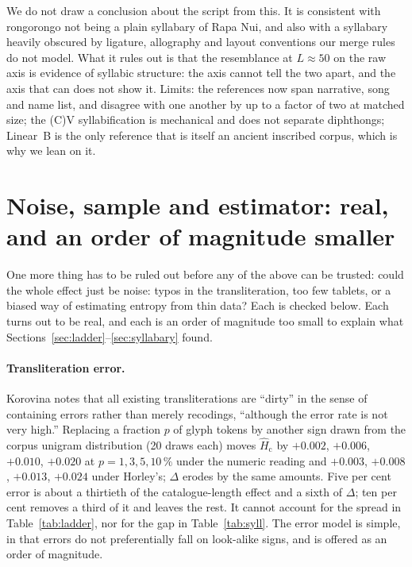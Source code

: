 \documentclass[11pt,a4paper]{article}
\newcommand{\Hcn}{\hat H_{\mathrm{c}}}
\begin{document}
We do not draw a conclusion about the script from this. It is consistent with rongorongo not being a plain syllabary of Rapa Nui, and also with a syllabary heavily obscured by ligature, allography and layout conventions our merge rules do not model. What it rules out is that the resemblance at $L\approx50$ on the raw axis is evidence of syllabic structure: the axis cannot tell the two apart, and the axis that can does not show it. Limits: the references now span narrative, song and name list, and disagree with one another by up to a factor of two at matched size; the (C)V syllabification is mechanical and does not separate diphthongs; Linear~B is the only reference that is itself an ancient inscribed corpus, which is why we lean on it.

\section{Noise, sample and estimator: real, and an order of magnitude smaller}
\label{sec:noise}

One more thing has to be ruled out before any of the above can be trusted: could the whole effect just be noise: typos in the transliteration, too few tablets, or a biased way of estimating entropy from thin data? Each is checked below. Each turns out to be real, and each is an order of magnitude too small to explain what Sections~\ref{sec:ladder}--\ref{sec:syllabary} found.

\paragraph{Transliteration error.} Korovina notes that all existing transliterations are ``dirty'' in the sense of containing errors rather than merely recodings, ``although the error rate is not very high.'' Replacing a fraction $p$ of glyph tokens by another sign drawn from the corpus unigram distribution (20 draws each) moves $\Hcn$ by $+0.002$, $+0.006$, $+0.010$, $+0.020$ at $p=1,3,5,10\,\%$ under the numeric reading and $+0.003$, $+0.008$, $+0.013$, $+0.024$ under Horley's; $\Delta$ erodes by the same amounts. Five per cent error is about a thirtieth of the catalogue-length effect and a sixth of $\Delta$; ten per cent removes a third of it and leaves the rest. It cannot account for the spread in Table~\ref{tab:ladder}, nor for the gap in Table~\ref{tab:syll}. The error model is simple, in that errors do not preferentially fall on look-alike signs, and is offered as an order of magnitude.
\end{document}
